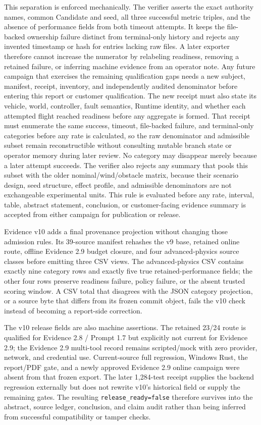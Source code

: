 This separation is enforced mechanically. The verifier asserts the exact
authority names, common Candidate and seed, all three successful metric
triples, and the absence of performance fields from both timeout attempts.
It keeps the file-backed ownership failure distinct from terminal-only
history and rejects any invented timestamp or hash for entries lacking raw
files. A later exporter therefore cannot increase the numerator by
relabeling readiness, removing a retained failure, or inferring machine
evidence from an operator note. Any future campaign that exercises the
remaining qualification gaps needs a new subject, manifest, receipt, inventory,
and independently audited denominator before entering this report or
customer qualification. The new receipt must also state its vehicle,
world, controller, fault semantics, Runtime identity, and whether each
attempted flight reached readiness before any aggregate is formed.
That receipt must enumerate the same success, timeout, file-backed
failure, and terminal-only categories before any rate is calculated, so
the raw denominator and admissible subset remain reconstructible without
consulting mutable branch state or operator memory during later review.
No category may disappear merely because a later attempt succeeds.
The verifier also rejects any summary that pools this subset with the
older nominal/wind/obstacle matrix, because their scenario design, seed
structure, effect profile, and admissible denominators are not
exchangeable experimental units. This rule is evaluated before any rate,
interval, table, abstract statement, conclusion, or customer-facing
evidence summary is accepted from either campaign for publication or
release.

Evidence v10 adds a final provenance projection without changing those
admission rules. Its 39-source manifest rehashes the v9 base, retained online
route, offline Evidence 2.9 budget closure, and four advanced-physics source
classes before emitting three CSV views. The advanced-physics CSV contains
exactly nine category rows and exactly five true retained-performance fields;
the other four rows preserve readiness failure, policy failure, or the absent
trusted scoring window. A CSV total that disagrees with the JSON category
projection, or a source byte that differs from its frozen commit object, fails
the v10 check instead of becoming a report-side correction.

The v10 release fields are also machine assertions. The retained 23/24 route
is qualified for Evidence 2.8 / Prompt 1.7 but explicitly not current for
Evidence 2.9; the Evidence 2.9 multi-tool record remains scripted/mock with
zero provider, network, and credential use. Current-source full regression,
Windows Rust, the report/PDF gate, and a newly approved Evidence 2.9 online
campaign were absent from that frozen export. The later 1,284-test receipt
supplies the backend regression externally but does not rewrite v10's
historical field or supply the remaining gates. The resulting
\texttt{release\_ready=false} therefore survives into the abstract, source
ledger, conclusion, and claim audit rather than being inferred from successful
compatibility or tamper checks.

